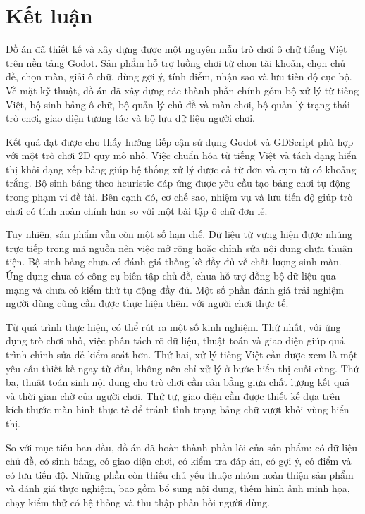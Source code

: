\documentclass[../DoAn.tex]{subfiles}
\begin{document}
\section{Kết luận}
Đồ án đã thiết kế và xây dựng được một nguyên mẫu trò chơi ô chữ tiếng Việt trên nền tảng Godot. Sản phẩm hỗ trợ luồng chơi từ chọn tài khoản, chọn chủ đề, chọn màn, giải ô chữ, dùng gợi ý, tính điểm, nhận sao và lưu tiến độ cục bộ. Về mặt kỹ thuật, đồ án đã xây dựng các thành phần chính gồm bộ xử lý từ tiếng Việt, bộ sinh bảng ô chữ, bộ quản lý chủ đề và màn chơi, bộ quản lý trạng thái trò chơi, giao diện tương tác và bộ lưu dữ liệu người chơi.

Kết quả đạt được cho thấy hướng tiếp cận sử dụng Godot và GDScript phù hợp với một trò chơi 2D quy mô nhỏ. Việc chuẩn hóa từ tiếng Việt và tách dạng hiển thị khỏi dạng xếp bảng giúp hệ thống xử lý được cả từ đơn và cụm từ có khoảng trắng. Bộ sinh bảng theo heuristic đáp ứng được yêu cầu tạo bảng chơi tự động trong phạm vi đề tài. Bên cạnh đó, cơ chế sao, nhiệm vụ và lưu tiến độ giúp trò chơi có tính hoàn chỉnh hơn so với một bài tập ô chữ đơn lẻ.

Tuy nhiên, sản phẩm vẫn còn một số hạn chế. Dữ liệu từ vựng hiện được nhúng trực tiếp trong mã nguồn nên việc mở rộng hoặc chỉnh sửa nội dung chưa thuận tiện. Bộ sinh bảng chưa có đánh giá thống kê đầy đủ về chất lượng sinh màn. Ứng dụng chưa có công cụ biên tập chủ đề, chưa hỗ trợ đồng bộ dữ liệu qua mạng và chưa có kiểm thử tự động đầy đủ. Một số phần đánh giá trải nghiệm người dùng cũng cần được thực hiện thêm với người chơi thực tế.

Từ quá trình thực hiện, có thể rút ra một số kinh nghiệm. Thứ nhất, với ứng dụng trò chơi nhỏ, việc phân tách rõ dữ liệu, thuật toán và giao diện giúp quá trình chỉnh sửa dễ kiểm soát hơn. Thứ hai, xử lý tiếng Việt cần được xem là một yêu cầu thiết kế ngay từ đầu, không nên chỉ xử lý ở bước hiển thị cuối cùng. Thứ ba, thuật toán sinh nội dung cho trò chơi cần cân bằng giữa chất lượng kết quả và thời gian chờ của người chơi. Thứ tư, giao diện cần được thiết kế dựa trên kích thước màn hình thực tế để tránh tình trạng bảng chữ vượt khỏi vùng hiển thị.

So với mục tiêu ban đầu, đồ án đã hoàn thành phần lõi của sản phẩm: có dữ liệu chủ đề, có sinh bảng, có giao diện chơi, có kiểm tra đáp án, có gợi ý, có điểm và có lưu tiến độ. Những phần còn thiếu chủ yếu thuộc nhóm hoàn thiện sản phẩm và đánh giá thực nghiệm, bao gồm bổ sung nội dung, thêm hình ảnh minh họa, chạy kiểm thử có hệ thống và thu thập phản hồi người dùng.
\end{document}
